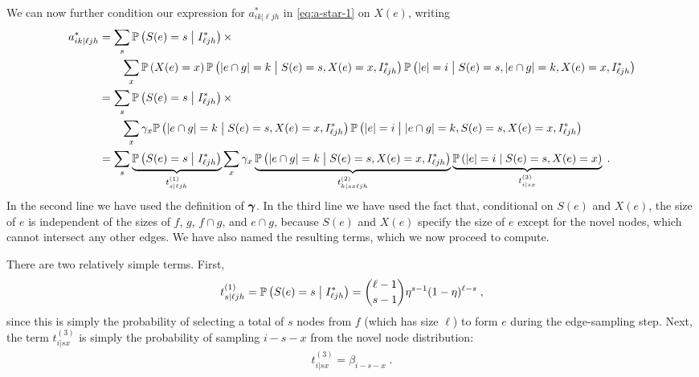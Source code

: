 We can now further condition our expression for $a^*_{ik|\ell j h}$ in \cref{eq:a-star-1} on $X(e)$, writing 
\begin{align}
    a^*_{ik|\ell j h} 
    &= \sum_{s} \prob{S(e) = s \given I^*_{\ell j h}} \times\nonumber\\
    &\qquad\sum_{x} \prob{X(e) = x}  \prob{\abs{e\cap g} = k \given S(e) = s , X(e) = x, I^*_{\ell j h}} \prob{\abs{e} = i \given  S(e) = s ,  \abs{e\cap g} = k , X(e) = x, I^*_{\ell j h}} \\ 
    &= \sum_{s} \prob{S(e) = s \given I^*_{\ell j h}} \times\nonumber\\
    &\qquad\sum_{x} \gamma_x  \prob{\abs{e\cap g} = k \given S(e) = s , X(e) = x, I^*_{\ell j h}} \prob{\abs{e} = i \given  \abs{e\cap g} = k, S(e) = s ,  X(e) = x, I^*_{\ell j h}} \\ 
    &= \sum_{s} \underbrace{\prob{S(e) = s \given I^*_{\ell j h}}}_{t^{(1)}_{s|\ell jh}} \sum_{x} \gamma_x  \underbrace{\prob{\abs{e\cap g} = k \given S(e) = s , X(e) = x, I^*_{\ell j h}}}_{t^{(2)}_{k|sx\ell jh}} \underbrace{\prob{\abs{e} = i \given S(e) = s, X(e) = x}}_{t^{(3)}_{i|sx}}\;. \label{eq:a}
\end{align}
In the second line we have used the definition of $\boldsymbol{\gamma}$. In the third line we have used the fact that, conditional on $S(e)$ and $X(e)$, the size of $e$ is independent of the sizes of $f$, $g$, $f\cap g$, and $e\cap g$, because $S(e)$ and $X(e)$ specify the size of $e$ except for the novel nodes, which cannot intersect any other edges. 
We have also named the resulting terms, which we now proceed to compute. 

There are two relatively simple terms. First,
\begin{align}
    t^{(1)}_{s|\ell j h} = \prob{S(e) = s \given I^*_{\ell j h}} = \binom{\ell-1}{s-1}\eta^{s-1}(1-\eta)^{\ell-s}\;, \label{eq:t1}
\end{align}
since this is simply the probability of selecting a total of $s$ nodes from $f$ (which has size $\ell$) to form $e$ during the edge-sampling step.
Next, the term $t^{(3)}_{i|sx}$ is simply the probability of sampling $i - s - x$ from the novel node distribution: 
\begin{align}
    t^{(3)}_{i|sx} = \beta_{i-s-x}\;. \label{eq:t3}
\end{align}

